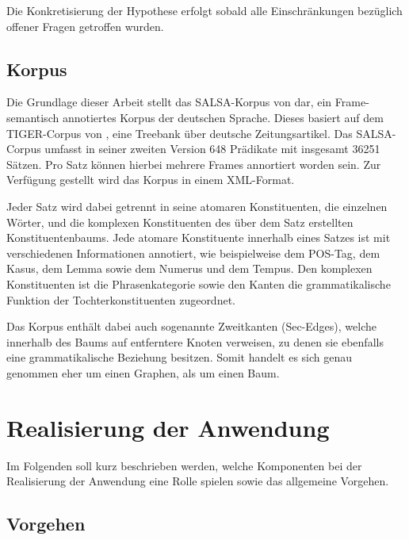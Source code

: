 \documentclass[12pt]{article}
\begin{document}

Die Konkretisierung der Hypothese erfolgt sobald alle Einschränkungen bezüglich
offener Fragen getroffen wurden.

\subsection{Korpus}

Die Grundlage dieser Arbeit stellt das SALSA-Korpus von
\cite{rehbein_adding_2012} dar, ein Frame-semantisch annotiertes Korpus der
deutschen Sprache. Dieses basiert auf dem TIGER-Corpus von \cite{tiger}, eine
Treebank über deutsche Zeitungsartikel. Das SALSA-Corpus umfasst in seiner
zweiten Version 648 Prädikate mit insgesamt 36251 Sätzen. Pro Satz können
hierbei mehrere Frames annortiert worden sein. Zur Verfügung gestellt wird das
Korpus in einem XML-Format.

Jeder Satz wird dabei getrennt in seine atomaren Konstituenten, die einzelnen
Wörter, und die komplexen Konstituenten des über dem Satz erstellten
Konstituentenbaums. Jede atomare Konstituente innerhalb eines Satzes ist mit
verschiedenen Informationen annotiert, wie beispielweise dem POS-Tag, dem Kasus,
dem Lemma sowie dem Numerus und dem Tempus. Den komplexen Konstituenten ist die
Phrasenkategorie sowie den Kanten die grammatikalische Funktion der Tochterkonstituenten zugeordnet.

Das Korpus enthält dabei auch sogenannte \glqq{}Zweitkanten\grqq{} (\glqq{}Sec-Edges\grqq{}), welche
innerhalb des Baums auf entferntere Knoten verweisen, zu denen sie ebenfalls
eine grammatikalische Beziehung besitzen. Somit handelt es sich genau genommen eher um einen
Graphen, als um einen Baum.


\section{Realisierung der Anwendung}

Im Folgenden soll kurz beschrieben werden, welche Komponenten bei der
Realisierung der Anwendung eine Rolle spielen sowie das allgemeine Vorgehen.

\subsection{Vorgehen}
\end{document}
